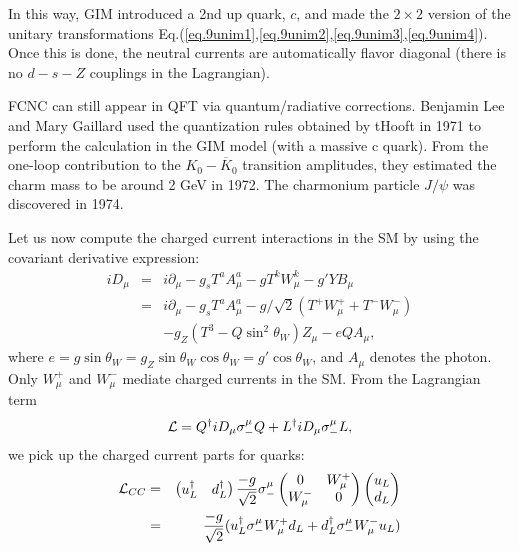 \documentclass[12pt]{article}
\def\del{{\partial}}
\begin{document}
  In this way, GIM introduced a 2nd up quark, $c$, and made the $2\times 2$
  version of the unitary transformations Eq.(\ref{eq.9unim1},\ref{eq.9unim2},\ref{eq.9unim3},\ref{eq.9unim4}). Once this is done, the neutral currents are automatically flavor diagonal (there is no $d-s-Z$ couplings in the Lagrangian).

  FCNC can still appear in QFT via quantum/radiative corrections.
  Benjamin Lee and Mary Gaillard used the quantization rules obtained
  by tHooft in 1971 to perform the calculation in the GIM model (with
  a massive c quark).  From the one-loop contribution to the $K_0-{\overline K_0}$ transition amplitudes, they estimated the charm mass to be around
  2 GeV in 1972.  The charmonium particle $J/\psi$ was discovered in 
1974.

  Let us now compute the charged current interactions in the SM by
  using the covariant derivative expression:
\begin{eqnarray}
  iD_\mu &=& i\del_\mu - g_s T^a A^a_\mu
                        - g   T^k W^k_\mu
                        - g'  Y   B_\mu \nonumber \\
             &=&i\del_\mu - g_s T^a A^a_\mu
                        - g/\sqrt2 ( T^+ W^+_\mu + T^- W^-_\mu )
                        \nonumber \\ &&- g_Z (T^3 -Q\sin^2\theta_W) Z_\mu
                        - e Q A_\mu,
\end{eqnarray}
  where $e = g\sin \theta _W = g_Z\sin\theta _W \cos\theta _W = g'\cos\theta _W$, and $A_\mu$ denotes the photon. Only $W^+_\mu$ and $W^-_\mu$ mediate charged currents in the SM.  From the Lagrangian term
\begin{eqnarray}
 {\cal L} = Q^\dagger iD_\mu \sigma_-^\mu Q
  + L^\dagger iD_\mu \sigma_-^\mu L,
\end{eqnarray}
    we pick up the charged current parts for quarks:
\begin{eqnarray}
  {\cal L} _{CC}
  &=& 
  \begin{pmatrix}
    u_L^\dagger & d_L^\dagger
  \end{pmatrix} 
  \frac{-g}{\sqrt2} \sigma_-^\mu
  \begin{pmatrix}
    0 & W^+_\mu\\
    W^-_\mu & 0
  \end{pmatrix}
  \begin{pmatrix}
    u_L \\ d_L
  \end{pmatrix}\\ 
    &=& \frac{-g}{\sqrt2} ( u_L^\dagger \sigma_-^\mu W^+_\mu d_L
              + d_L^\dagger \sigma_-^\mu W^-_\mu u_L )
\end{eqnarray}
\end{document}

